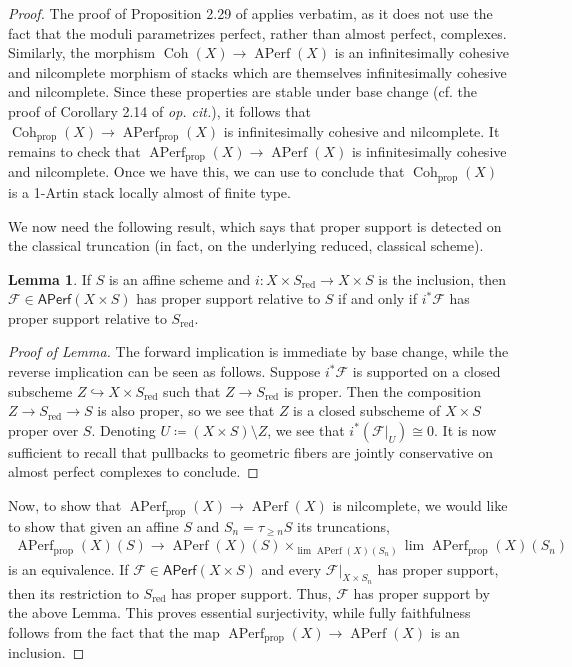 \documentclass{article}
\numberwithin{equation}{section}
\theoremstyle{quest}
\theoremstyle{definition}
\newtheorem{lem}[thm]{Lemma}
\theoremstyle{remark}
\DeclareMathOperator{\Coh}{Coh}
\DeclareMathOperator{\APerf}{APerf}
\begin{document}
\begin{proof}
	The proof of Proposition 2.29 of \cite{PS} applies verbatim, as it does not use the fact that the moduli parametrizes perfect, rather than almost perfect, complexes. Similarly, the morphism $\Coh(X)\to \APerf(X)$ is an infinitesimally cohesive and nilcomplete morphism of stacks which are themselves infinitesimally cohesive and nilcomplete. Since these properties are stable under base change (cf. the proof of Corollary 2.14 of \textit{op. cit.}), it follows that $\Coh_{\text{prop}}(X)\to \APerf_{\text{prop}}(X)$ is infinitesimally cohesive and nilcomplete. It remains to check that $\APerf_{\text{prop}}(X)\to \APerf(X)$ is infinitesimally cohesive and nilcomplete. Once we have this, we can use \cite[Theorem 18.1.0.2]{sag} to conclude that $\Coh_{\text{prop}}(X)$ is a 1-Artin stack locally almost of finite type. 

	We now need the following result, which says that proper support is detected on the classical truncation (in fact, on the underlying reduced, classical scheme).
	\begin{lem}\label{lem:proper-support-is-detected-on-the-classical-truncation}
		If $S$ is an affine scheme and $i:X\times S_{\text{red}}\to X\times S$ is the inclusion, then $\mathscr{F}\in \mathsf{APerf}(X \times S)$ has proper support relative to $S$ if and only if $i^*\mathscr{F}$ has proper support relative to $S_{\text{red}}$.
	\end{lem}  
	\begin{proof}[Proof of Lemma]
	 The forward implication is immediate by base change, while the reverse implication can be seen as follows. Suppose $i^*\mathscr{F}$ is supported on a closed subscheme $Z \hookrightarrow X\times S_{\text{red}}$ such that $Z \to S_{\text{red}}$ is proper. Then the composition $Z \to S_{\text{red}}\to S$ is also proper, so we see that $Z $ is a closed subscheme of $X\times S$ proper over $S$. Denoting $U\coloneqq (X\times S)\setminus Z $, we see that $i^*(\mathscr{F}|_U)\cong 0$. It is now sufficient to recall that pullbacks to geometric fibers are jointly conservative on almost perfect complexes to conclude. 
\end{proof}
	Now, to show that $\APerf_{\text{prop}}(X)\to \APerf(X)$ is nilcomplete, we would like to show that given an affine $S$ and $S_n=\tau_{\ge n}S$ its truncations,
	\begin{align*}
		\APerf_{\text{prop}}(X)(S)\to \APerf(X)(S)\times _{\lim \APerf(X)(S_n)}\lim \APerf_{\text{prop}}(X)(S_n)
	\end{align*} 
	is an equivalence. If $\mathscr{F}\in \mathsf{APerf}(X\times S)$ and every $\mathscr{F}|_{X\times S_n}$ has proper support, then its restriction to $S_{\text{red}}$ has proper support. Thus, $\mathscr{F}$ has proper support by the above Lemma. This proves essential surjectivity, while fully faithfulness follows from the fact that the map $\APerf_{\text{prop}}(X)\to \APerf(X)$ is an inclusion.


\end{proof}
\end{document}
